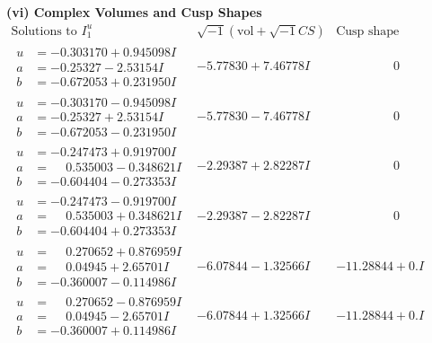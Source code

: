 \documentclass[1p]{elsarticle_modified}
\theoremstyle{definition}
\newcommand{\I}{\sqrt{-1}}
\begin{document}
\newpage\flushleft \textbf{(vi) Complex Volumes and Cusp Shapes}
$$\begin{array}{c|c|c}  
\text{Solutions to }I^u_{1}& \I (\text{vol} + \sqrt{-1}CS) & \text{Cusp shape}\\
 \hline 
\begin{aligned}
u &= -0.303170 + 0.945098 I \\
a &= -0.25327 - 2.53154 I \\
b &= -0.672053 + 0.231950 I\end{aligned}
 & -5.77830 + 7.46778 I & \phantom{-0.000000 } 0 \\ \hline\begin{aligned}
u &= -0.303170 - 0.945098 I \\
a &= -0.25327 + 2.53154 I \\
b &= -0.672053 - 0.231950 I\end{aligned}
 & -5.77830 - 7.46778 I & \phantom{-0.000000 } 0 \\ \hline\begin{aligned}
u &= -0.247473 + 0.919700 I \\
a &= \phantom{-}0.535003 - 0.348621 I \\
b &= -0.604404 - 0.273353 I\end{aligned}
 & -2.29387 + 2.82287 I & \phantom{-0.000000 } 0 \\ \hline\begin{aligned}
u &= -0.247473 - 0.919700 I \\
a &= \phantom{-}0.535003 + 0.348621 I \\
b &= -0.604404 + 0.273353 I\end{aligned}
 & -2.29387 - 2.82287 I & \phantom{-0.000000 } 0 \\ \hline\begin{aligned}
u &= \phantom{-}0.270652 + 0.876959 I \\
a &= \phantom{-}0.04945 + 2.65701 I \\
b &= -0.360007 - 0.114986 I\end{aligned}
 & -6.07844 - 1.32566 I & -11.28844 + 0. I\phantom{ +0.000000I} \\ \hline\begin{aligned}
u &= \phantom{-}0.270652 - 0.876959 I \\
a &= \phantom{-}0.04945 - 2.65701 I \\
b &= -0.360007 + 0.114986 I\end{aligned}
 & -6.07844 + 1.32566 I & -11.28844 + 0. I\phantom{ +0.000000I} \\ \hline\begin{aligned}

\end{aligned}
\end{array}$$
\end{document}
